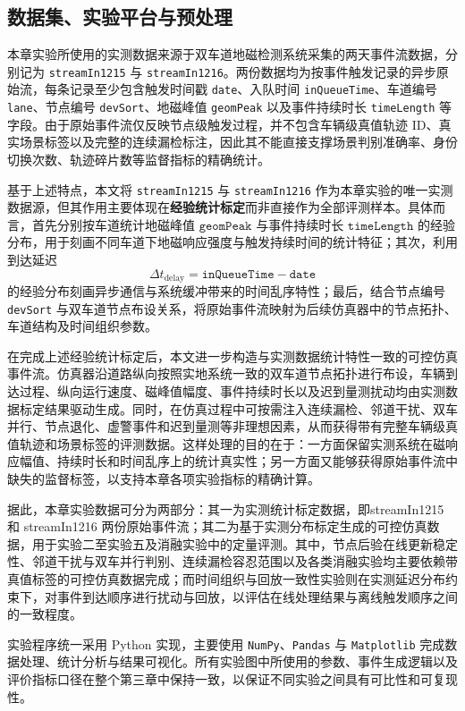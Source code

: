 \documentclass{xdupgthesis}
\begin{document}
\subsection{数据集、实验平台与预处理}

本章实验所使用的实测数据来源于双车道地磁检测系统采集的两天事件流数据，分别记为 \texttt{streamIn1215} 与 \texttt{streamIn1216}。两份数据均为按事件触发记录的异步原始流，每条记录至少包含触发时间戳 \texttt{date}、入队时间 \texttt{inQueueTime}、车道编号 \texttt{lane}、节点编号 \texttt{devSort}、地磁峰值 \texttt{geomPeak} 以及事件持续时长 \texttt{timeLength} 等字段。由于原始事件流仅反映节点级触发过程，并不包含车辆级真值轨迹 ID、真实场景标签以及完整的连续漏检标注，因此其不能直接支撑场景判别准确率、身份切换次数、轨迹碎片数等监督指标的精确统计。

基于上述特点，本文将 \texttt{streamIn1215} 与 \texttt{streamIn1216} 作为本章实验的唯一实测数据源，但其作用主要体现在\textbf{经验统计标定}而非直接作为全部评测样本。具体而言，首先分别按车道统计地磁峰值 $\texttt{geomPeak}$ 与事件持续时长 $\texttt{timeLength}$ 的经验分布，用于刻画不同车道下地磁响应强度与触发持续时间的统计特征；其次，利用到达延迟
\[
\Delta t_{\mathrm{delay}}=\texttt{inQueueTime}-\texttt{date}
\]
的经验分布刻画异步通信与系统缓冲带来的时间乱序特性；最后，结合节点编号 \texttt{devSort} 与双车道节点布设关系，将原始事件流映射为后续仿真器中的节点拓扑、车道结构及时间组织参数。

在完成上述经验统计标定后，本文进一步构造与实测数据统计特性一致的可控仿真事件流。仿真器沿道路纵向按照实地系统一致的双车道节点拓扑进行布设，车辆到达过程、纵向运行速度、磁峰值幅度、事件持续时长以及迟到量测扰动均由实测数据标定结果驱动生成。同时，在仿真过程中可按需注入连续漏检、邻道干扰、双车并行、节点退化、虚警事件和迟到量测等非理想因素，从而获得带有完整车辆级真值轨迹和场景标签的评测数据。这样处理的目的在于：一方面保留实测系统在磁响应幅值、持续时长和时间乱序上的统计真实性；另一方面又能够获得原始事件流中缺失的监督标签，以支持本章各项实验指标的精确计算。

据此，本章实验数据可分为两部分：其一为实测统计标定数据，即streamIn1215 和 streamIn1216 两份原始事件流；其二为基于实测分布标定生成的可控仿真数据，用于实验二至实验五及消融实验中的定量评测。其中，节点后验在线更新稳定性、邻道干扰与双车并行判别、连续漏检容忍范围以及各类消融实验均主要依赖带真值标签的可控仿真数据完成；而时间组织与回放一致性实验则在实测延迟分布约束下，对事件到达顺序进行扰动与回放，以评估在线处理结果与离线触发顺序之间的一致程度。

实验程序统一采用 Python 实现，主要使用 \texttt{NumPy}、\texttt{Pandas} 与 \texttt{Matplotlib} 完成数据处理、统计分析与结果可视化。所有实验图中所使用的参数、事件生成逻辑以及评价指标口径在整个第三章中保持一致，以保证不同实验之间具有可比性和可复现性。
\end{document}
